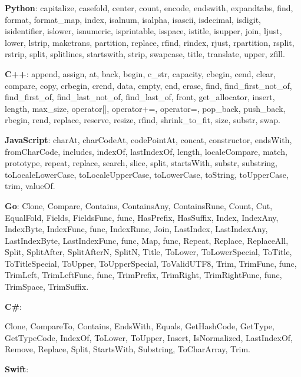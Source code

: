 \documentclass[anonymous,sigplan,review,11pt,nonacm,natbib=false]{acmart}
\begin{document}
    \textbf{Python}: capitalize, casefold, center, count, encode, endswith, expandtabs, find, format, format\_map, index, isalnum, isalpha, isascii, isdecimal, isdigit, isidentifier, islower, isnumeric, isprintable, isspace, istitle, isupper, join, ljust, lower, lstrip, maketrans, partition, replace, rfind, rindex, rjust, rpartition, rsplit, rstrip, split, splitlines, startswith, strip, swapcase, title, translate, upper, zfill.

    \textbf{C++}: append, assign, at, back, begin, c\_str, capacity, cbegin, cend, clear, compare, copy, crbegin, crend, data, empty, end, erase, find, find\_first\_not\_of, find\_first\_of, find\_last\_not\_of, find\_last\_of, front, get\_allocator, insert, length, max\_size, operator[], operator+=, operator=, pop\_back, push\_back, rbegin, rend, replace, reserve, resize, rfind, shrink\_to\_fit, size, substr, swap.

    \textbf{JavaScript}: charAt, charCodeAt, codePointAt, concat, constructor, endsWith, fromCharCode, includes, indexOf, lastIndexOf, length, localeCompare, match, prototype, repeat, replace, search, slice, split, startsWith, substr, substring, toLocaleLowerCase, toLocaleUpperCase, toLowerCase, toString, toUpperCase, trim, valueOf.

    \textbf{Go}: Clone, Compare, Contains, ContainsAny, ContainsRune, Count, Cut, EqualFold, Fields, FieldsFunc, func, HasPrefix, HasSuffix, Index, IndexAny, IndexByte, IndexFunc, func, IndexRune, Join, LastIndex, LastIndexAny, LastIndexByte, LastIndexFunc, func, Map, func, Repeat, Replace, ReplaceAll, Split, SplitAfter, SplitAfterN, SplitN, Title, ToLower, ToLowerSpecial, ToTitle, ToTitleSpecial, ToUpper, ToUpperSpecial, ToValidUTF8, Trim, TrimFunc, func, TrimLeft, TrimLeftFunc, func, TrimPrefix, TrimRight, TrimRightFunc, func, TrimSpace, TrimSuffix.

    \textbf{C\#}:

    Clone, CompareTo, Contains, EndsWith, Equals, GetHashCode, GetType, GetTypeCode, IndexOf, ToLower, ToUpper, Insert, IsNormalized, LastIndexOf, Remove, Replace, Split, StartsWith, Substring, ToCharArray, Trim.

    \textbf{Swift}:
\end{document}
